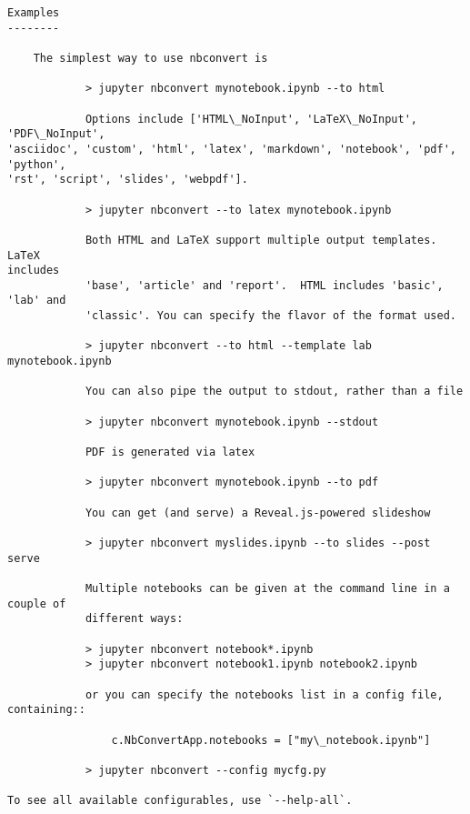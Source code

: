 \documentclass[11pt]{article}
\makeatletter
\newcommand{\boxspacing}{\kern\kvtcb@left@rule\kern\kvtcb@boxsep}
\newcommand{\prompt}[4]{
        {\ttfamily\llap{{\color{#2}[#3]:\hspace{3pt}#4}}\vspace{-\baselineskip}}
    }
\makeatother
\begin{document}
\begin{Verbatim}[commandchars=\\\{\}]
Examples
--------

    The simplest way to use nbconvert is

            > jupyter nbconvert mynotebook.ipynb --to html

            Options include ['HTML\_NoInput', 'LaTeX\_NoInput', 'PDF\_NoInput',
'asciidoc', 'custom', 'html', 'latex', 'markdown', 'notebook', 'pdf', 'python',
'rst', 'script', 'slides', 'webpdf'].

            > jupyter nbconvert --to latex mynotebook.ipynb

            Both HTML and LaTeX support multiple output templates. LaTeX
includes
            'base', 'article' and 'report'.  HTML includes 'basic', 'lab' and
            'classic'. You can specify the flavor of the format used.

            > jupyter nbconvert --to html --template lab mynotebook.ipynb

            You can also pipe the output to stdout, rather than a file

            > jupyter nbconvert mynotebook.ipynb --stdout

            PDF is generated via latex

            > jupyter nbconvert mynotebook.ipynb --to pdf

            You can get (and serve) a Reveal.js-powered slideshow

            > jupyter nbconvert myslides.ipynb --to slides --post serve

            Multiple notebooks can be given at the command line in a couple of
            different ways:

            > jupyter nbconvert notebook*.ipynb
            > jupyter nbconvert notebook1.ipynb notebook2.ipynb

            or you can specify the notebooks list in a config file, containing::

                c.NbConvertApp.notebooks = ["my\_notebook.ipynb"]

            > jupyter nbconvert --config mycfg.py

To see all available configurables, use `--help-all`.

    \end{Verbatim}

    \begin{tcolorbox}[breakable, size=fbox, boxrule=1pt, pad at break*=1mm,colback=cellbackground, colframe=cellborder]
\prompt{In}{incolor}{ }{\boxspacing}
\begin{Verbatim}[commandchars=\\\{\}]

\end{Verbatim}
\end{tcolorbox}

    \begin{tcolorbox}[breakable, size=fbox, boxrule=1pt, pad at break*=1mm,colback=cellbackground, colframe=cellborder]
\prompt{In}{incolor}{ }{\boxspacing}
\begin{Verbatim}[commandchars=\\\{\}]

\end{Verbatim}
\end{tcolorbox}


    
    
    
\end{document}
